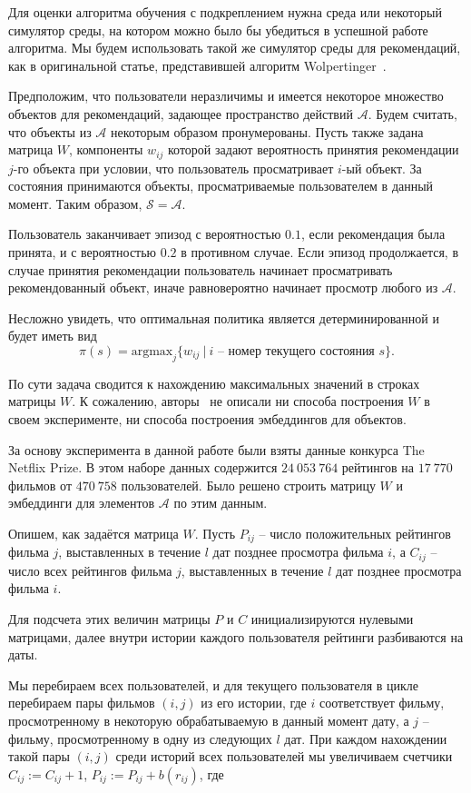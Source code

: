 \documentclass[a4paper, 12pt]{article}
\newcommand{\argmax}{\textrm{argmax}}
\begin{document}
Для оценки алгоритма обучения с подкреплением нужна среда или некоторый симулятор среды, на котором можно было бы убедиться в успешной работе алгоритма.
Мы будем использовать такой же симулятор среды для рекомендаций, как в оригинальной статье, представившей алгоритм Wolpertinger~\cite{wolpertinger}.

Предположим, что пользователи неразличимы и имеется некоторое множество объектов для рекомендаций, задающее пространство действий $\mathcal{A}$. Будем считать, что объекты из $\mathcal{A}$ некоторым образом пронумерованы. Пусть также задана матрица $W$, компоненты $w_{ij}$ которой задают вероятность принятия рекомендации $j$-го объекта при условии, что пользователь просматривает $i$-ый объект. 
За состояния принимаются объекты, просматриваемые пользователем в данный момент.
Таким образом,  $\mathcal{S}=\mathcal{A}$. 

Пользователь заканчивает эпизод с вероятностью $0.1$, если рекомендация была принята, и с вероятностью $0.2$ в противном случае. 
Если эпизод продолжается, в случае принятия рекомендации пользователь начинает просматривать рекомендованный объект, иначе равновероятно начинает просмотр любого из $\mathcal{A}$.

Несложно увидеть, что оптимальная политика является детерминированной и будет иметь вид $$\pi(s)=\argmax_j \{ w_{ij}~|~\text{$i$ --  номер текущего состояния $s$} \}.$$

По сути задача сводится к нахождению максимальных значений в строках матрицы $W$.
К сожалению, авторы~\cite{wolpertinger} не описали ни способа построения $W$ в своем эксперименте, ни способа построения эмбеддингов для объектов.

За основу эксперимента в данной работе были взяты данные конкурса The Netflix Prize.
В этом наборе данных содержится $24~053~764$ рейтингов на $17~770$ фильмов от $470~758$ пользователей.
Было решено строить матрицу $W$ и эмбеддинги для элементов $\mathcal{A}$ по этим данным.


Опишем, как задаётся матрица $W$.  Пусть $P_{ij}$ -- число положительных рейтингов фильма $j$, выставленных в течение $l$ дат позднее просмотра фильма $i$,  а $C_{ij}$ -- число всех рейтингов фильма $j$, выставленных в течение $l$ дат позднее просмотра фильма $i$.

 Для подсчета этих величин матрицы $P$ и $C$ инициализируются нулевыми матрицами, далее внутри истории каждого пользователя рейтинги разбиваются на даты. 
 
 Мы перебираем всех пользователей, и для текущего пользователя в цикле перебираем пары фильмов $(i, j)$ из его истории, где $i$ соответствует фильму, просмотренному в некоторую обрабатываемую в данный момент дату, а $j$ -- фильму, просмотренному в одну из следующих $l$ дат. При каждом нахождении такой пары $(i, j)$ среди историй всех пользователей мы увеличиваем счетчики $C_{ij} := C_{ij} + 1$, $P_{ij} := P_{ij} + b(r_{ij})$, где
 
\end{document}
